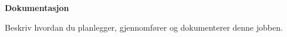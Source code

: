 \vskip 10pt 
\textbf{Dokumentasjon}


Beskriv hvordan du planlegger, gjennomfører og dokumenterer denne jobben. 












\vfil \eject

















